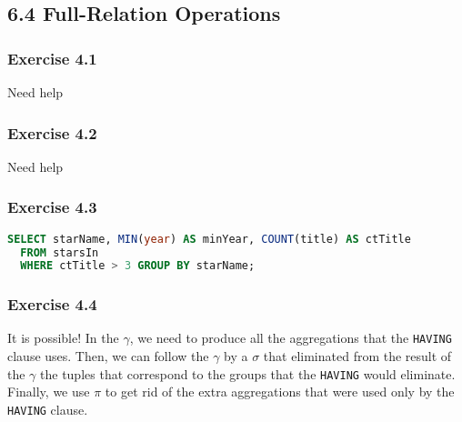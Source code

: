 \documentclass[../../main.tex]{subfiles}
\begin{document}
\subsection*{6.4 Full-Relation Operations}

\subsubsection*{Exercise 4.1}


Need help

\subsubsection*{Exercise 4.2}


Need help

\subsubsection*{Exercise 4.3}

\begin{lstlisting}[language=sql]
  SELECT starName, MIN(year) AS minYear, COUNT(title) AS ctTitle
  FROM starsIn
  WHERE ctTitle > 3 GROUP BY starName;
\end{lstlisting}

\subsubsection*{Exercise 4.4}

It is possible! In the $\gamma$, we need to produce all the aggregations
that the \verb|HAVING| clause uses. Then, we can follow the $\gamma$
by a $\sigma$ that eliminated from the result of the $\gamma$
the tuples that correspond to the groups that the \verb|HAVING| would eliminate.
Finally, we use $\pi$ to get rid of the extra aggregations that
were used only by the \verb|HAVING| clause.
\end{document}
